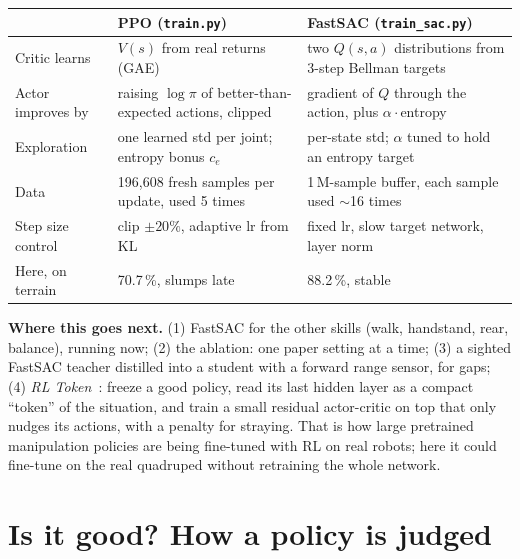\documentclass[10pt,letterpaper]{article}
\begin{document}
\begin{small}
\begin{tabularx}{\linewidth}{@{}p{3.1cm}XX@{}}
\toprule
& \textbf{PPO} (\texttt{train.py}) & \textbf{FastSAC} (\texttt{train\_sac.py}) \\ \midrule
Critic learns & $V(s)$ from real returns (GAE) & two $Q(s,a)$ distributions from 3-step Bellman targets \\
Actor improves by & raising $\log\pi$ of better-than-expected actions, clipped & gradient of $Q$ through the action, plus $\alpha\cdot$entropy \\
Exploration & one learned std per joint; entropy bonus $c_e$ & per-state std; $\alpha$ tuned to hold an entropy target \\
Data & 196{,}608 fresh samples per update, used 5 times & 1\,M-sample buffer, each sample used $\sim$16 times \\
Step size control & clip $\pm20\%$, adaptive lr from KL & fixed lr, slow target network, layer norm \\
Here, on terrain & 70.7\,\%, slumps late & 88.2\,\%, stable \\ \bottomrule
\end{tabularx}
\end{small}

\textbf{Where this goes next.} (1) FastSAC for the other skills (walk, handstand, rear, balance), running now; (2) the ablation:
one paper setting at a time; (3) a sighted FastSAC teacher distilled into a student with a forward range sensor, for gaps;
(4) \emph{RL Token}~\cite{xu2026}: freeze a good policy, read its last hidden layer as a compact ``token'' of the situation, and train a
small residual actor-critic on top that only nudges its actions, with a penalty for straying. That is how large pretrained
manipulation policies are being fine-tuned with RL on real robots; here it could fine-tune on the real quadruped without
retraining the whole network.

\section{Is it good? How a policy is judged}
\end{document}
